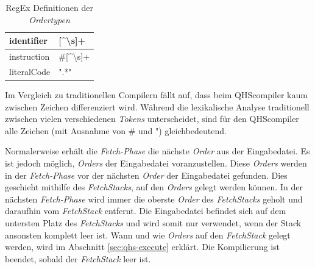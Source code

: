 \begin{table}[h]
    \fontsize{13}{17}\selectfont
    \centering
    \caption{RegEx Definitionen der \textit{Ordertypen}}
    \vspace{3mm} %
    
    \begin{tabular}{l>{\listingFont\selectfont}l}
    \multicolumn{1}{l|}{identifier}        & {[}\textasciicircum \textbackslash{}s{]}+                         \\ \hline
    \multicolumn{1}{l|}{instruction}       & \#{[}\textasciicircum \textbackslash{}s{]}+                      \\ \hline
    \multicolumn{1}{l|}{literalCode}       & ".*"                                                              \\
    
    \end{tabular}
\end{table}

Im Vergleich zu traditionellen Compilern fällt auf, dass beim QHScompiler kaum zwischen Zeichen differenziert wird. Während die lexikalische Analyse traditionell zwischen vielen verschiedenen \textit{Tokens} unterscheidet,
sind für den QHScompiler alle Zeichen (mit Ausnahme von {\listingFont\selectfont \#} und {\listingFont\selectfont "{}}) gleichbedeutend.

Normalerweise erhält die \textit{Fetch-Phase} die nächste \textit{Order} aus der Eingabedatei. 
Es ist jedoch möglich, \textit{Orders} der Eingabedatei voranzustellen. Diese \textit{Orders} werden in der \textit{Fetch-Phase} vor der nächsten \textit{Order} der Eingabedatei gefunden.
Dies geschieht mithilfe des \textit{FetchStacks}, auf den \textit{Orders} gelegt werden können.
In der nächsten \textit{Fetch-Phase} wird immer die oberste \textit{Order} des \textit{FetchStacks} geholt und daraufhin vom \textit{FetchStack} entfernt.
Die Eingabedatei befindet sich auf dem untersten Platz des \textit{FetchStacks} und wird somit nur verwendet, wenn der Stack ansonsten komplett leer ist.
Wann und wie \textit{Orders} auf den \textit{FetchStack} gelegt werden, wird im Abschnitt \ref{sec:qhs-execute} erklärt.
Die Kompilierung ist beendet, sobald der \textit{FetchStack} leer ist.

